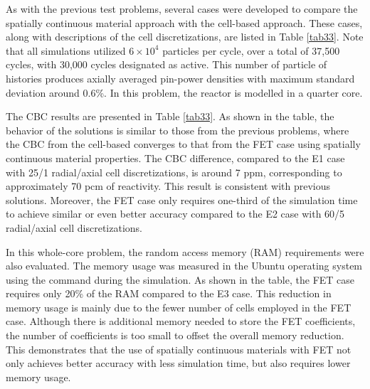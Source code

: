 As with the previous test problems, several cases were developed to compare the spatially continuous material approach with the cell-based approach. These cases, along with descriptions of the cell discretizations, are listed in Table \ref{tab33}. Note that all simulations utilized \(6 \times 10^4\) particles per cycle, over a total of 37,500 cycles, with 30,000 cycles designated as active. This number of particle of histories produces axially averaged pin-power densities with maximum standard deviation around 0.6\%. In this problem, the reactor is modelled in a quarter core.

The CBC results are presented in Table \ref{tab33}. As shown in the table, the behavior of the solutions is similar to those from the previous problems, where the CBC from the cell-based converges to that from the FET case using spatially continuous material properties. The CBC difference, compared to the E1 case with 25/1 radial/axial cell discretizations, is around 7 ppm, corresponding to approximately 70 pcm of reactivity. This result is consistent with previous solutions. Moreover, the FET case only requires one-third of the simulation time to achieve similar or even better accuracy compared to the E2 case with 60/5 radial/axial cell discretizations.

In this whole-core problem, the random access memory (RAM) requirements were also evaluated. The memory usage was measured in the Ubuntu operating system using the  command during the simulation. As shown in the table, the FET case requires only 20\% of the RAM compared to the E3 case. This reduction in memory usage is mainly due to the fewer number of cells employed in the FET case. Although there is additional memory needed to store the FET coefficients, the number of coefficients is too small to offset the overall memory reduction. This demonstrates that the use of spatially continuous materials with FET not only achieves better accuracy with less simulation time, but also requires lower memory usage.

